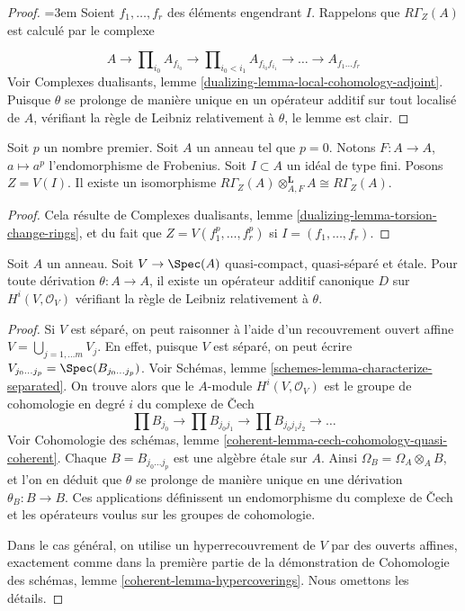 \begin{proof}
{\emergencystretch=3em
Soient $f_1, \ldots, f_r$ des éléments engendrant $I$. Rappelons que $R\Gamma_Z(A)$ est calculé par le complexe
\par}
$$
A \to \prod\nolimits_{i_0} A_{f_{i_0}} \to
\prod\nolimits_{i_0 < i_1} A_{f_{i_0}f_{i_1}}
\to \ldots \to A_{f_1\ldots f_r}
$$
Voir Complexes dualisants, lemme \ref{dualizing-lemma-local-cohomology-adjoint}. Puisque $\theta$ se prolonge de manière unique en un opérateur additif sur tout localisé de $A$, vérifiant la règle de Leibniz relativement à $\theta$, le lemme est clair.
\end{proof}

\begin{lemma}
\label{lemma-frobenius}
Soit $p$ un nombre premier. Soit $A$ un anneau tel que $p = 0$. Notons $F : A \to A$, $a \mapsto a^p$ l'endomorphisme de Frobenius. Soit $I \subset A$ un idéal de type fini. Posons $Z = V(I)$. Il existe un isomorphisme $R\Gamma_Z(A) \otimes_{A, F}^\mathbf{L} A \cong R\Gamma_Z(A)$.
\end{lemma}

\begin{proof}
Cela résulte de Complexes dualisants, lemme \ref{dualizing-lemma-torsion-change-rings}, et du fait que $Z = V(f_1^p, \ldots, f_r^p)$ si $I = (f_1, \ldots, f_r)$.
\end{proof}

\begin{lemma}
\label{lemma-etale-derivation}
Soit $A$ un anneau. Soit $V \to \Spec(A)$ quasi-compact, quasi-séparé et \'etale. Pour toute dérivation $\theta : A \to A$, il existe un opérateur additif canonique $D$ sur $H^i(V, \mathcal{O}_V)$ vérifiant la règle de Leibniz relativement à $\theta$.
\end{lemma}

\begin{proof}
Si $V$ est séparé, on peut raisonner à l'aide d'un recouvrement ouvert affine $V = \bigcup_{j = 1, \ldots m} V_j$. En effet, puisque $V$ est séparé, on peut écrire $V_{j_0 \ldots j_p} = \Spec(B_{j_0 \ldots j_p})$. Voir Schémas, lemme \ref{schemes-lemma-characterize-separated}. On trouve alors que le $A$-module $H^i(V, \mathcal{O}_V)$ est le groupe de cohomologie en degré $i$ du complexe de {\v C}ech
$$
\prod B_{j_0} \to
\prod B_{j_0j_1} \to
\prod B_{j_0j_1j_2} \to \ldots
$$
Voir Cohomologie des schémas, lemme \ref{coherent-lemma-cech-cohomology-quasi-coherent}. Chaque $B = B_{j_0 \ldots j_p}$ est une algèbre \'etale sur $A$. Ainsi $\Omega_B = \Omega_A \otimes_A B$, et l'on en déduit que $\theta$ se prolonge de manière unique en une dérivation $\theta_B : B \to B$. Ces applications définissent un endomorphisme du complexe de {\v C}ech et les opérateurs voulus sur les groupes de cohomologie.

\medskip\noindent
Dans le cas général, on utilise un hyperrecouvrement de $V$ par des ouverts affines, exactement comme dans la première partie de la démonstration de Cohomologie des schémas, lemme \ref{coherent-lemma-hypercoverings}. Nous omettons les détails.
\end{proof}

